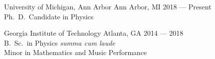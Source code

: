 \begin{minipage}[t]{0.2\textwidth}
	\flushleft
\end{minipage}
\begin{minipage}[t]{0.8\textwidth}

	
	\education
	{University of Michigan, Ann Arbor}
	{Ann Arbor, MI}
	{
	2018 --- Present\\
	Ph.\ D.\ Candidate in Physics
	}




	\education
	{Georgia Institute of Technology}
	{Atlanta, GA}
	{
	2014 --- 2018\\
	B.\ Sc.\ in Physics \textit{summa cum laude}\\
	Minor in Mathematics and Music Performance
	}
\end{minipage}

\vspace{8pt}
